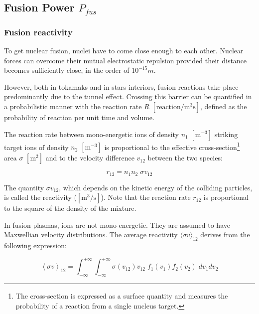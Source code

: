 \subsection{Fusion Power $P_{fus}$}
\subsubsection{Fusion reactivity}
To get nuclear fusion, nuclei have to come close enough to each other. Nuclear forces can overcome their mutual electrostatic repulsion provided their distance becomes sufficiently close, in the order of $10^{-15}\si{m}$. %

However, both in tokamaks and in stars interiors, fusion reactions take place predominantly due to the tunnel effect. Crossing this barrier can be quantified in a probabilistic manner with the reaction rate $R$ $[\mathrm{reaction/m^3 s}]$, defined as the probability of reaction per unit time and volume. 

The reaction rate between mono-energetic ions of density $n_1$ $\mathrm{[m^{-3}]}$ striking target ions of density $n_2$ $\mathrm{[m^{-3}]}$ is proportional to the effective cross-section\footnote{The cross-section is expressed as a surface quantity and measures the probability of a reaction from a single nucleus target.} area $\sigma$ $\mathrm{[m^2]}$ and to the velocity difference $v_{12}$ between the two species:

\begin{equation*}
r_{12} = n_1 n_2 \; \sigma v_{12}
\end{equation*}

The quantity $\sigma v_{12}$, which depends on the kinetic energy of the colliding particles, is called the reactivity ($\mathrm{[m^3/s]}$). Note that the reaction rate $r_{12}$ is proportional to the square of the density of the mixture. 

In fusion plasmas, ions are not mono-energetic. They are assumed to have Maxwellian velocity distributions. The average reactivity $\langle \sigma v \rangle_{12}$ derives from the following expression:

\begin{equation*}
\left < \sigma v \right >_{12} 
= \int_{-\infty}^{+\infty} \int_{-\infty}^{+\infty} 
\sigma(v_{12}) v_{12}\;  f_1(v_1) f_2(v_2) \; dv_1dv_2
\end{equation*}

